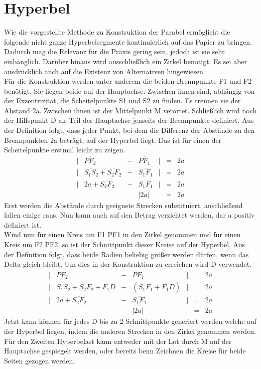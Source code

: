 \section{Hyperbel}
Wie die vorgestellte Methode zu Konstruktion der Parabel ermöglicht die folgende nicht ganze Hyperbelsegmente kontinuierlich auf das Papier zu bringen. Dadurch mag die Relevanz für die Praxis gering sein, jedoch ist sie sehr einbänglich. Darüber hinaus wird ausschließlich ein Zirkel benötigt. Es sei aber ausdrücklich auch auf die Existenz von Alternativen hingewiesen.\\
Für die Konstruktion werden unter anderem die beiden Brennpunkte F1 und F2 benötigt. Sie liegen beide auf der Hauptachse. Zwischen ihnen sind, abhängig von der Exzentrizität, die Scheitelpunkte S1 und S2 zu finden. Es trennen sie der Abstand 2a. Zwischen ihnen ist der Mittelpunkt M verortet. Schließlich wird noch der Hilfspunkt D als Teil der Hauptachse jenseits der Brennpunkte definiert.
Aus der Definition folgt, dass jeder Punkt, bei dem die Differenz der Abstände zu den Brennpunkten 2a beträgt, auf der Hyperbel liegt. Das ist für einen der Scheitelpunkte erstmal leicht zu zeigen.
\begin{displaymath}
	\begin{array}{lcccrcl}
		|&\overline{{PF}_2} & - & \overline{{PF}_1}&| & = & 2a\\
		|&\overline{{S}_1{S}_2}+\overline{{S}_2{F}_2} & - & \overline{{S}_1{F}_1}&| & = & 2a\\
		|&2a+\overline{{S}_2{F}_2} & - & \overline{{S}_1{F}_1}&| & = & 2a\\
		&&&|2a| && = & 2a
	\end{array}
\end{displaymath}
Erst werden die Abstände durch geeignete Strecken substituiert, anschließend fallen einige raus. Nun kann auch auf den Betrag verzichtet werden, dar a positiv definiert ist.\\
Wind nun für einen Kreis um F1 PF1 in den Zirkel genommen und für einen Kreis um F2 PF2, so ist der Schnittpunkt dieser Kreise auf der Hyperbel. Aus der Definition folgt, dass beide Radien beliebig größer werden dürfen, wenn das Delta gleich bleibt. Um dies in der Konstruktion zu erreichen wird D verwendet.
\begin{displaymath}
	\begin{array}{lcccrcl}
		|&\overline{{PF}_2} & - & \overline{{PF}_1}&| & = & 2a\\
		|&\overline{{S}_1{S}_2}+\overline{{S}_2{F}_2}+\overline{{F}_1{D}} & - & (\overline{{S}_1{F}_1}+\overline{{F}_1{D}})&| & = & 2a\\
		|&2a+\overline{{S}_2{F}_2} & - & \overline{{S}_1{F}_1}&| & = & 2a\\
		&&&|2a| && = & 2a
	\end{array}
\end{displaymath}
Jetzt kann können für jedes D bis zu 2 Schnittpunkte generiert werden welche auf der Hyperbel liegen, indem die anderen Strecken in den Zirkel genommen werden. Für den Zweiten Hyperbelast kann entweder mit der Lot durch M auf der Hauptachse gespiegelt werden, oder bereits beim Zeichnen die Kreise für beide Seiten gezogen werden.\\